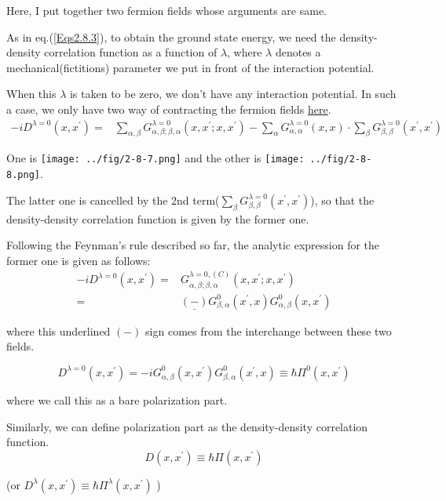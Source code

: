 Here, I put together two fermion fields whose arguments are same.

As in eq.(\ref{Eqs2.8.3}), to obtain the ground state energy, we need the density-density correlation function as a function of $\lambda$, where $\lambda$ denotes a mechanical(fictitions) parameter we put in front of the interaction potential.

When this $\lambda$ is taken to be zero, we don't have any interaction potential. In such a case, we only have two way of contracting the fermion fields \underline{here}.
\[\begin{split}
-i D^{\lambda=0}(x,x^{'})=& \sum_{\alpha,\beta} G^{\lambda=0}_{\alpha,\beta;\beta,\alpha}(x,x^{'};x,x^{'}) - \sum_{\alpha}G^{\lambda=0}_{\alpha,\alpha}(x,x)\cdot\sum_{\beta}G^{\lambda=0}_{\beta,\beta}(x^{'},x^{'})
\end{split}\]

One is {\label{Fig2.8.7} \texttt{[image: ../fig/2-8-7.png]}} and the other is {\label{Fig2.8.8} \texttt{[image: ../fig/2-8-8.png]}}.

The latter one is cancelled by the 2nd term($\sum_{\beta} G^{\lambda=0}_{\beta,\beta}(x^{'},x^{'})$), so that the density-density correlation function is given by the former one.

Following the Feynman's rule described so far, the analytic expression for the former one is given as follows:
\[\begin{split}-i D^{\lambda=0}(x,x^{'})=&G^{\lambda=0,(C)}_{\alpha,\beta;\beta,\alpha}(x,x^{'};x,x^{'})\\
=& \underline{(-)} G^0_{\beta,\alpha}(x^{'},x) G^0_{\alpha,\beta}(x,x^{'})\end{split}\]

where this underlined $(-)$ sign comes from the interchange between these two fields.

\[D^{\lambda=0}(x,x^{'})=-i G^0_{\alpha,\beta}(x,x^{'}) G^0_{\beta,\alpha}(x^{'},x) \equiv \hbar \Pi^0(x,x^{'})\]

where we call this as a bare polarization part.

Similarly, we can define polarization part as the density-density correlation function.
\begin{equation*} \label{Eqs2.8.4'} \tag{2.8.4'}
D(x,x^{'}) \equiv \hbar \Pi(x,x^{'})
\end{equation*}

(or $D^{\lambda}(x,x^{'}) \equiv \hbar \Pi^{\lambda}(x,x^{'})$ )

